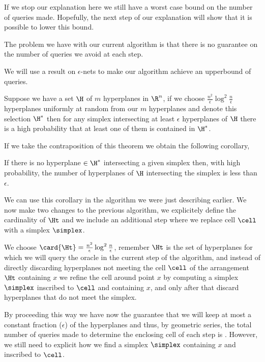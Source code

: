 If we stop our explanation here we still have a worst case 
bound on the number of queries made. Hopefully, the next step of our
explanation will show that it is possible to lower this bound.

The problem we have with our current algorithm is that there is no guarantee
on the number of queries we avoid at each step.

We will use a result on $\epsilon$-nets to make our algorithm achieve an
upperbound of  queries.

\begin{theorem}
Suppose we have a set $\H$ of $m$ hyperplanes in $\R^n$, if we choose
$\frac{n^2}{\epsilon} \log^2 \frac{n}{\epsilon}$ hyperplanes uniformly at
random from our $m$ hyperplanes and denote this selection $\H^{*}$ then for
any simplex intersecting at least $\epsilon$ hyperplanes of $\H$ there is a
high probability that at least one of them is contained in $\H^{*}$.
\end{theorem}

If we take the contraposition of this theorem we obtain the following
corollary,

\begin{corollary}
If there is no hyperplane $\in \H^{*}$ intersecting a given simplex then, with
high probability, the number of hyperplanes of $\H$ intersecting the simplex
is less than $\epsilon$.
\end{corollary}

We can use this corollary in the algorithm we were just describing earlier. We
now make two changes to the previous algorithm, we explicitely define the
cardinality of $\Ht$ and we include an additional step where we replace cell
$\cell$ with a simplex $\simplex$.

We choose $\card{\Ht} = \frac{n^2}{\epsilon} \log^2 \frac{n}{\epsilon}$,
remember $\Ht$ is the set of hyperplanes for which we will query the oracle in
the current step of the algorithm, and instead of directly discarding
hyperplanes not meeting the cell $\cell$ of the arrangement $\Ht$ containing $x$ we
refine the cell around point $x$ by computing a simplex $\simplex$ inscribed
to $\cell$ and containing $x$, and only after that discard hyperplanes that do
not meet the simplex.

By proceeding this way we have now the guarantee that we will keep at most a
constant fraction ($\epsilon$) of the hyperplanes and thus, by geometric
series, the total number of queries made to determine the enclosing cell of
each step is . However, we
still need to explicit how we find a simplex $\simplex$ containing $x$ and
inscribed to $\cell$.

